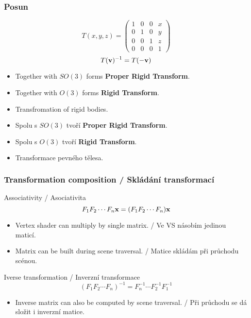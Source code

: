 \begin{frame}\frametitle{Posun}\scriptsize
    \begin{equation*}
        T(x,y,z) = \begin{pmatrix}
            1&0&0&x\\0&1&0&y\\0&0&1&z\\0&0&0&1
        \end{pmatrix}
    \end{equation*}
    \vfill
    \begin{equation*}
        T(\mathbf{v})^{-1} = T(-\mathbf{v})
    \end{equation*}
    \vfill
    \begin{itemize}
        \item Together with $SO(3)$ forms \textbf{Proper Rigid Transform}.
        \item Together with $O(3)$ forms \textbf{Rigid Transform}.
        \item Transfromation of rigid bodies.
    \end{itemize}
    \begin{itemize}
        \item Spolu s $SO(3)$ tvoří \textbf{Proper Rigid Transform}.
        \item Spolu s $O(3)$ tvoří \textbf{Rigid Transform}.
        \item Transformace pevného tělesa.
    \end{itemize}
\end{frame}


\begin{frame}\frametitle{Transformation composition / Skládání transformací}\scriptsize
    Associativity / Asociativita
    \begin{equation*}
        F_1F_2\dotsb F_n\mathbf{x} = (F_1F_2\dotsb F_n)\mathbf{x}
    \end{equation*}
    \begin{itemize}
        \item Vertex shader can multiply by single matrix. / Ve VS násobím jedinou maticí.
        \item Matrix can be built during scene traversal. / Matice skládám při průchodu scénou.
    \end{itemize}
    \pause\vfill
    Iverse transformation / Inverzní transformace
    \begin{equation*}
        (F_1F_2\dotsb F_n)^{-1} = F_n^{-1}\dotsb F_2^{-1}F_1^{-1}
    \end{equation*}
    \begin{itemize}
        \item Inverse matrix can also be computed by scene traversal. / Při průchodu se dá složit i inverzní matice.
    \end{itemize}
\end{frame}

